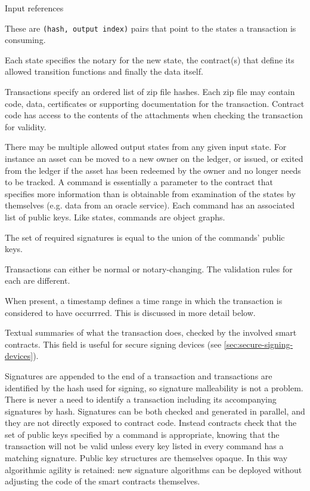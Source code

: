 \documentclass{article}
\begin{document}
\begin{labeling}{Input references}
\item [Input references] These are \texttt{(hash, output index)} pairs that point to the states a
transaction is consuming.
\item [Output states] Each state specifies the notary for the new state, the contract(s) that define its allowed
transition functions and finally the data itself.
\item [Attachments] Transactions specify an ordered list of zip file hashes. Each zip file may contain
code, data, certificates or supporting documentation for the transaction. Contract code has access to the contents
of the attachments when checking the transaction for validity.
\item [Commands] There may be multiple allowed output states from any given input state. For instance
an asset can be moved to a new owner on the ledger, or issued, or exited from the ledger if the asset has been
redeemed by the owner and no longer needs to be tracked. A command is essentially a parameter to the contract
that specifies more information than is obtainable from examination of the states by themselves (e.g. data from an oracle
service). Each command has an associated list of public keys. Like states, commands are object graphs.
\item [Signatures] The set of required signatures is equal to the union of the commands' public keys.
\item [Type] Transactions can either be normal or notary-changing. The validation rules for each are
different.
\item [Timestamp] When present, a timestamp defines a time range in which the transaction is considered to
have occurrred. This is discussed in more detail below.
\item [Summaries] Textual summaries of what the transaction does, checked by the involved smart contracts. This field
is useful for secure signing devices (see \cref{sec:secure-signing-devices}).
\end{labeling}


Signatures are appended to the end of a transaction and transactions are identified by the hash used for signing, so
signature malleability is not a problem. There is never a need to identify a transaction including its accompanying
signatures by hash. Signatures can be both checked and generated in parallel, and they are not directly exposed to
contract code. Instead contracts check that the set of public keys specified by a command is appropriate, knowing that
the transaction will not be valid unless every key listed in every command has a matching signature. Public key
structures are themselves opaque. In this way algorithmic agility is retained: new signature algorithms can be deployed
without adjusting the code of the smart contracts themselves.
\end{document}
